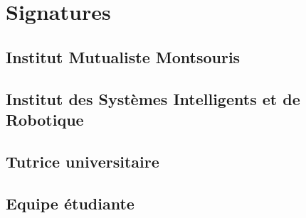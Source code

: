 \chapter*{Signatures}
\section*{Institut Mutualiste Montsouris}

\vspace{3cm}

\section*{Institut des Systèmes Intelligents et de Robotique}

\vspace{3cm}

\section*{Tutrice universitaire}

\vspace{3cm}

\section*{Equipe étudiante}

\vspace{3cm}